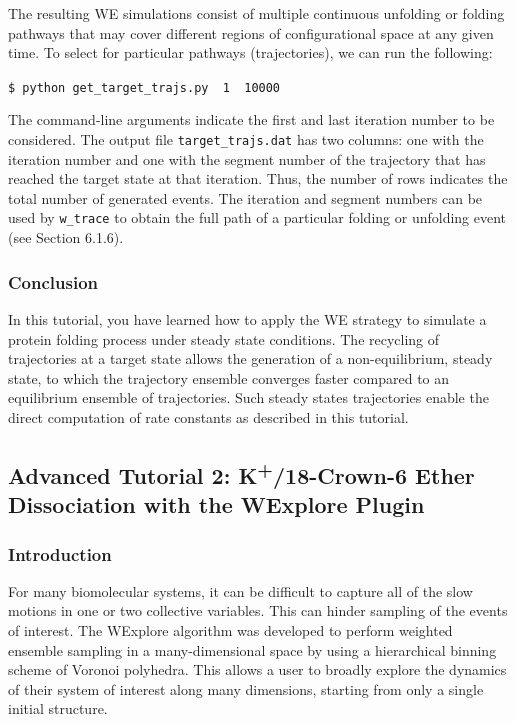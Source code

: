 \documentclass[9pt,tutorial,ASAPversion]{livecoms}
\begin{document}
The resulting WE simulations consist of multiple continuous unfolding or folding pathways that may cover different regions of configurational space at any given time. 
To select for particular pathways (trajectories), we can run the following: 
 
\verb|$ python get_target_trajs.py  1  10000|

The command-line arguments indicate the first and last iteration number to be considered. 
The output file \verb|target_trajs.dat| has two columns: one with the iteration number and one with the segment number of the trajectory that has reached the target state at that iteration. 
Thus, the number of rows indicates the total number of generated events. 
The iteration and segment numbers can be used by \verb|w_trace| to obtain the full path of a particular folding or unfolding event (see Section 6.1.6).

\subsubsection{Conclusion}

In this tutorial, you have learned how to apply the WE strategy to simulate a protein folding process under steady state conditions. 
The recycling of trajectories at a target state allows the generation of a non-equilibrium, steady state, to which the trajectory ensemble converges faster compared to an equilibrium ensemble of trajectories. 
Such steady states trajectories enable  the direct computation of rate constants as described in this tutorial.   

\subsection{Advanced Tutorial 2: K\textsuperscript{+}/18-Crown-6 Ether Dissociation with the WExplore Plugin}

\subsubsection{Introduction}

For many biomolecular systems, it can be difficult to capture all of the slow motions in one or two collective variables. 
This can hinder sampling of the events of interest. 
The WExplore algorithm was developed to perform weighted ensemble sampling in a many-dimensional space by using a hierarchical binning scheme of Voronoi polyhedra. 
This allows a user to broadly explore the dynamics of their system of interest along many dimensions, starting from only a single initial structure.
\end{document}
